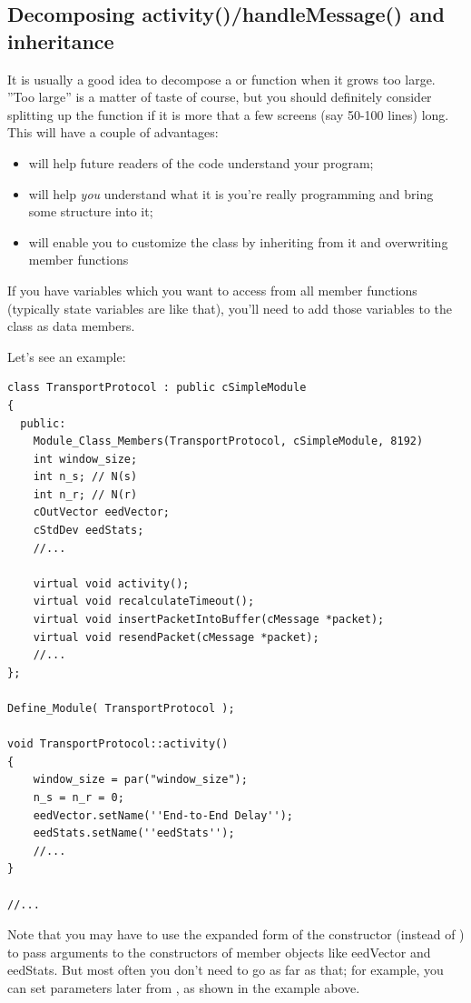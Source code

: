 \subsection{Decomposing activity()/handleMessage() and inheritance}

It is usually a good idea to decompose a  or
 function when it grows too large. ''Too
large'' is a matter of taste of course, but you should definitely
consider splitting up the function if it is more that a few screens
(say 50-100 lines) long. This will have a couple of advantages:
\begin{itemize}
\item{will help future readers of the code understand your program;}
\item{will help \textit{you} understand what it is you're really programming
and bring some structure into it;}
\item{will enable you to customize the class by inheriting from it and
    overwriting member functions}
\end{itemize}

If you have variables which you want to access from all member
functions (typically state variables are like that), you'll need to
add those variables to the class as data members.

Let's see an example:

\begin{verbatim}
class TransportProtocol : public cSimpleModule
{
  public:
    Module_Class_Members(TransportProtocol, cSimpleModule, 8192)
    int window_size;
    int n_s; // N(s)
    int n_r; // N(r)
    cOutVector eedVector;
    cStdDev eedStats;
    //...

    virtual void activity();
    virtual void recalculateTimeout();
    virtual void insertPacketIntoBuffer(cMessage *packet);
    virtual void resendPacket(cMessage *packet);
    //...
};

Define_Module( TransportProtocol );

void TransportProtocol::activity()
{
    window_size = par("window_size");
    n_s = n_r = 0;
    eedVector.setName(''End-to-End Delay'');
    eedStats.setName(''eedStats'');
    //...
}

//...
\end{verbatim}

\begin{sloppypar}
  Note that you may have to use the expanded form of the
  constructor (instead of
  ) to pass arguments to the constructors
  of member objects like eedVector and eedStats. But most often you
  don't need to go as far as that; for example, you can set parameters
  later from , as shown in the example above.
\end{sloppypar}

